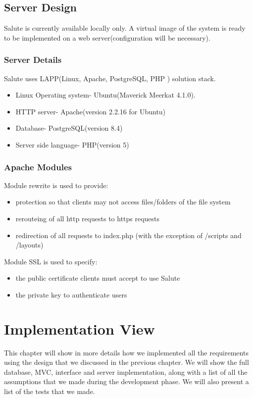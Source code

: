 \documentclass[10pt]{report}
\begin{document}
\section{Server Design}
Salute is currently available locally only. A virtual image of the system is ready to be implemented on a web server(configuration will be necessary).

\subsection{Server Details}
Salute uses LAPP(Linux, Apache, PostgreSQL, PHP ) solution stack.
\begin{itemize}
\item Linux Operating system- Ubuntu(Maverick Meerkat 4.1.0). 
\item HTTP server- Apache(version 2.2.16 for Ubuntu)
\item Database- PostgreSQL(version 8.4)
\item Server side language- PHP(version 5)
\end{itemize}

\subsection{Apache Modules}
Module rewrite is used to provide:
\begin{itemize}
\item protection so that clients may not access files/folders of the file system
\item rerouteing of all http requests to https requests
\item redirection of all requests to index.php (with the exception of /scripts and /layouts)
\end{itemize}
Module SSL is used to specify:
\begin{itemize}
\item the public certificate clients must accept to use Salute
\item the private key to authenticate users
\end{itemize}

\chapter{Implementation View}
This chapter will show in more details how we implemented all the requirements using the design that we discussed in the previous chapter. We will show the full database, MVC, interface and server implementation, along with a list of all the assumptions that we made during the development phase. We will also present a list of the tests that we made.
\end{document}
